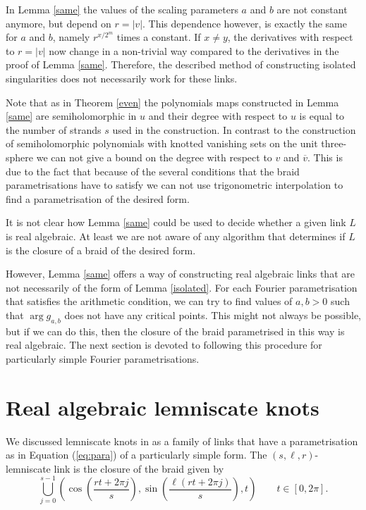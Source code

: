\documentclass[notitlepage,12pt]{revtex4-1}
\begin{document}
In Lemma \ref{same} the values of the scaling parameters $a$ and $b$ are not constant anymore, but depend on $r=|v|$. This dependence however, is exactly the same for $a$ and $b$, namely $r^{x/2^{m}}$ times a constant.
If $x\neq y$, the derivatives with respect to $r=|v|$ now change in a non-trivial way compared to the derivatives in the proof of Lemma \ref{same}. Therefore, the described method of constructing isolated singularities does not necessarily work for these links.  

Note that as in Theorem \ref{even} the polynomials maps constructed in Lemma \ref{same} are semiholomorphic in $u$ and their degree with respect to $u$ is equal to the number of strands $s$ used in the construction. In contrast to the construction of semiholomorphic polynomials with knotted vanishing sets on the unit three-sphere we can not give a bound on the degree with respect to $v$ and $\overline{v}$. This is due to the fact that because of the several conditions that the braid parametrisations have to satisfy we can not use trigonometric interpolation to find a parametrisation of the desired form.  

It is not clear how Lemma \ref{same} could be used to decide whether a given link $L$ is real algebraic. At least we are not aware of any algorithm that determines if $L$ is the closure of a braid of the desired form.
 
However, Lemma \ref{same} offers a way of constructing real algebraic links that are not necessarily of the form of Lemma \ref{isolated}. For each Fourier parametrisation that satisfies the arithmetic condition, we can try to find values of $a, b>0$ such that $\arg g_{a,b}$ does not have any critical points. This might not always be possible, but if we can do this, then the closure of the braid parametrised in this way is real algebraic. The next section is devoted to following this procedure for particularly simple Fourier parametrisations.
 

\section{Real algebraic lemniscate knots}
\label{lemniscatesection}

We discussed lemniscate knots in \cite{bode:2016lemniscate} as a family of links that have a parametrisation as in Equation (\ref{eq:para}) of a  particularly simple form. The $(s,\ell,r)$-lemniscate link is the closure of the braid given by
\begin{equation}
\label{eq:lemnipara}
\bigcup_{j=0}^{s-1}\left(\cos\left(\frac{rt+2\pi j}{s}\right),\sin\left(\frac{\ell(rt+2\pi j)}{s}\right),t\right)\qquad t\in[0,2\pi].
\end{equation} 
\end{document}
